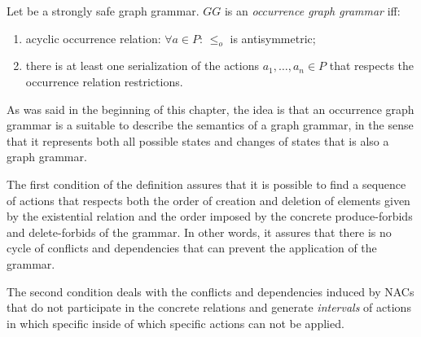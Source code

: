 \begin{definition}\label{def:ogg} Let \doublyTypedGraphGrammarCore{} be a strongly safe graph grammar. $GG$ is an \emph{occurrence graph grammar} iff:

  \begin{enumerate}
    \item acyclic occurrence relation: $\forall a \in P$: $\leq_o$ is antisymmetric;
    \item there is at least one serialization of the actions $a_1,\ldots,a_n \in P$ that respects the occurrence relation restrictions.
  \end{enumerate}
\end{definition}

As was said in the beginning of this chapter, the idea is that an occurrence graph grammar is a suitable to describe the semantics of a graph grammar, in the sense that it represents both all possible states and changes of states that is also a graph grammar.

The first condition of the definition assures that it is possible to find a sequence of actions that respects both the order of creation and deletion of elements given by the existential relation and the order imposed by the concrete produce-forbids and delete-forbids of the grammar. In other words, it assures that there is no cycle of conflicts and dependencies that can prevent the application of the grammar.

The second condition deals with the conflicts and dependencies induced by NACs that do not participate in the concrete relations and generate \emph{intervals} of actions in which specific inside of which specific actions can not be applied.
